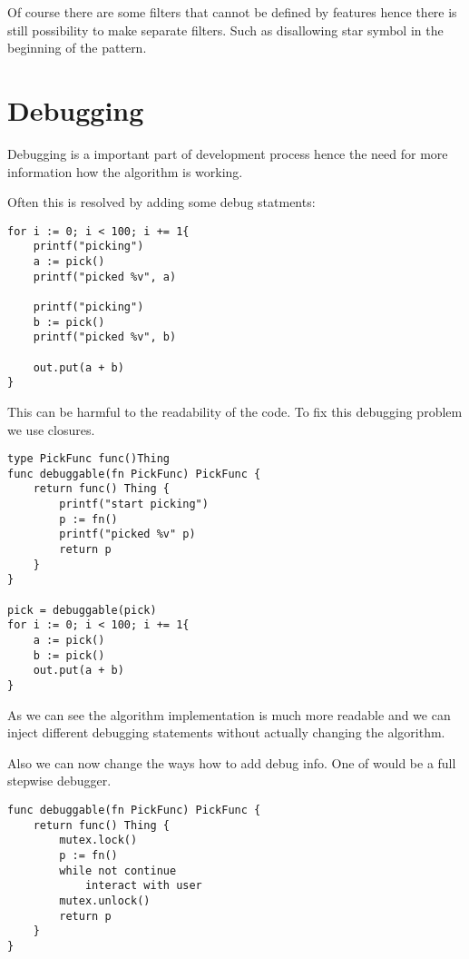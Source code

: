Of course there are some filters that cannot be defined by features hence
there is still possibility to make separate filters. Such as disallowing
star symbol in the beginning of the pattern.

\section{Debugging}

Debugging is a important part of development process hence the need for 
more information how the algorithm is working.

Often this is resolved by adding some debug statments:

\begin{verbatim}
for i := 0; i < 100; i += 1{
	printf("picking")
	a := pick()
	printf("picked %v", a)

	printf("picking")
	b := pick()
	printf("picked %v", b)
	
	out.put(a + b)
}
\end{verbatim}

This can be harmful to the readability of the code. To fix this debugging problem we use closures.

\begin{verbatim}
type PickFunc func()Thing
func debuggable(fn PickFunc) PickFunc {
	return func() Thing {
		printf("start picking")
		p := fn()
		printf("picked %v" p)
		return p
	}
}

pick = debuggable(pick)
for i := 0; i < 100; i += 1{
	a := pick()
	b := pick()
	out.put(a + b)
}
\end{verbatim}

As we can see the algorithm implementation is much more readable and 
we can inject different debugging statements without actually changing the algorithm.

Also we can now change the ways how to add debug info. One of would 
be a full stepwise debugger.

\begin{verbatim}
func debuggable(fn PickFunc) PickFunc {
	return func() Thing {
		mutex.lock()
		p := fn()
		while not continue
			interact with user
		mutex.unlock()
		return p
	}
}
\end{verbatim}
